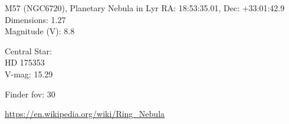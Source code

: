 \begin{block}{M57 (NGC6720), Planetary Nebula in Lyr}
    RA: 18:53:35.01, Dec: +33:01:42.9 \\ 
    Dimensions: 1.27 \\ 
    Magnitude (V): 8.8


    Central Star: \\ 
      \hspace{1em}HD 175353 \\ 
      \hspace{1em}V-mag: 15.29 


    Finder fov: 30 

    \url{https://en.wikipedia.org/wiki/Ring_Nebula} 
\end{block}